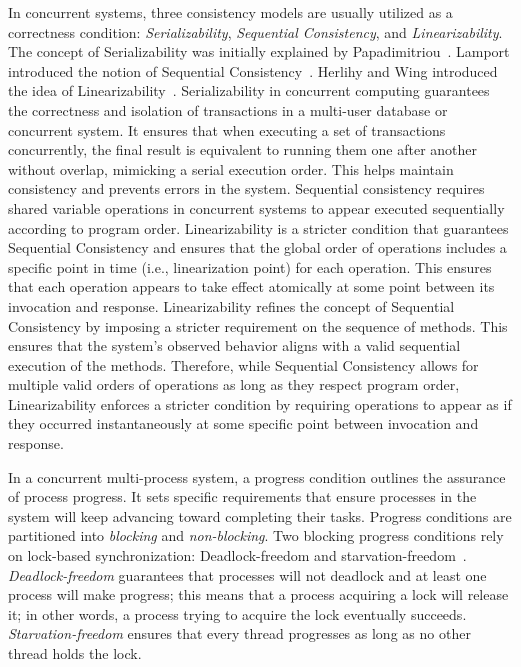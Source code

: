 In concurrent systems, three consistency models are usually utilized as a correctness condition: \textit{Serializability}, \textit{Sequential Consistency}, and \textit{Linearizability}. The concept of Serializability was initially explained by Papadimitriou~\cite{DBLP_journals_jacm_Papadimitriou79b}. Lamport introduced the notion of Sequential Consistency~\cite{lamport1979how}. Herlihy and Wing introduced the idea of Linearizability~\cite{DBLP_journals_toplas_HerlihyW90}.
Serializability in concurrent computing guarantees the correctness and isolation of transactions in a multi-user database or concurrent system. It ensures that when executing a set of transactions concurrently, the final result is equivalent to running them one after another without overlap, mimicking a serial execution order. This helps maintain consistency and prevents errors in the system.
Sequential consistency requires shared variable operations in concurrent systems to appear executed sequentially according to program order. Linearizability is a stricter condition that guarantees Sequential Consistency and ensures that the global order of operations includes a specific point in time (i.e., linearization point) for each operation. This ensures that each operation appears to take effect atomically at some point between its invocation and response. Linearizability refines the concept of Sequential Consistency by imposing a stricter requirement on the sequence of methods. This ensures that the system's observed behavior aligns with a valid sequential execution of the methods. Therefore, while Sequential Consistency allows for multiple valid orders of operations as long as they respect program order, Linearizability enforces a stricter condition by requiring operations to appear as if they occurred instantaneously at some specific point between invocation and response.

In a concurrent multi-process system, a progress condition outlines the assurance of process progress. It sets specific requirements that ensure processes in the system will keep advancing toward completing their tasks. Progress conditions are partitioned into \textit{blocking} and \textit{non-blocking}. Two blocking progress conditions rely on lock-based synchronization: Deadlock-freedom and starvation-freedom~\cite{DBLP_books_daglib_0020056}. \textit{Deadlock-freedom} guarantees that processes will not deadlock and at least one process will make progress; this means that a process acquiring a lock will release it; in other words, a process trying to acquire the lock eventually succeeds. \textit{Starvation-freedom} ensures that every thread progresses as long as no other thread holds the lock.

